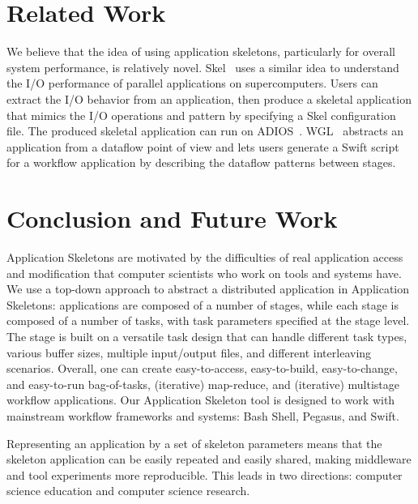 \documentclass[preprint,12pt]{elsarticle}
\newcommand{\katznote}[1]{ {\textcolor{blue}    { ***Dan:   #1 }}}
\newcommand{\amnote}[1]{{\textcolor{magenta}    { ***Andre: #1 }}}
\newcommand{\katznote}[1]{}
\newcommand{\amnote}[1]{}
\begin{document}
\section{Related Work}\label{lb:RFwork}


We believe that the idea of using application skeletons, particularly for overall system performance, is relatively novel.  Skel~\cite{Skel} uses a similar idea to understand the I/O performance of parallel applications on supercomputers. Users can extract 
the I/O behavior from an application, then produce a skeletal application that mimics the I/O operations and pattern by specifying
a Skel configuration file. The produced skeletal application can run on ADIOS~\cite{ADIOS}. 
WGL~\cite{WGL} abstracts an application from a dataflow point of view and lets users generate a Swift script for a workflow application by 
describing the dataflow patterns between stages.

\section{Conclusion and Future Work}\label{lb:Con}

Application Skeletons are motivated by the difficulties of real application access and modification that computer scientists who work on tools and systems have. We use a top-down approach to abstract a distributed application in Application Skeletons: applications 
are composed of a number of stages, while each stage is composed of a number of tasks, with task parameters specified at the stage level. The stage is built on a versatile task design that can handle different task types, various buffer
sizes, multiple input/output files, and different interleaving scenarios. Overall, one can create easy-to-access, easy-to-build, easy-to-change, and easy-to-run bag-of-tasks, 
(iterative) map-reduce, and (iterative) multistage workflow applications. Our Application Skeleton  tool is designed to work with mainstream workflow
frameworks and systems: Bash Shell, Pegasus, and Swift.

Representing an application by a set of skeleton parameters means that the skeleton application  can be easily repeated and easily shared, making 
middleware and tool experiments more reproducible.  This leads in two directions: computer science education and computer science research.
\end{document}
